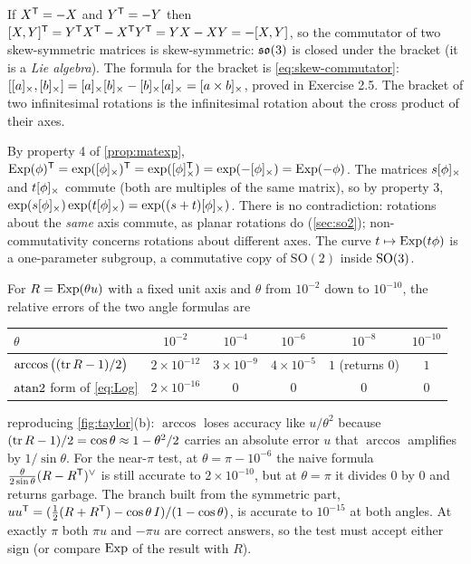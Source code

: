 \begin{solutions}
  \item If $X^{\mathsf{T}} = -X$ and $Y^{\mathsf{T}} = -Y$ then $[X, Y]^{\mathsf{T}} = Y^{\mathsf{T}} X^{\mathsf{T}} - X^{\mathsf{T}} Y^{\mathsf{T}} = YX - XY = -[X, Y]$, so the commutator of two skew-symmetric matrices is
        skew-symmetric: $\mathfrak{so}(3)$ is closed under the bracket (it is a \emph{Lie algebra}). The formula for the bracket is \eqref{eq:skew-commutator}:
        $[[a]_{\times}, [b]_{\times}] = [a]_{\times}[b]_{\times} - [b]_{\times}[a]_{\times} = [a\times b]_{\times}$, proved in Exercise 2.5. The bracket of two infinitesimal rotations is the
        infinitesimal rotation about the cross product of their axes.

  \item By property 4 of \cref{prop:matexp}, $\operatorname{Exp}(\phi)^{\mathsf{T}} = \exp([\phi]_{\times})^{\mathsf{T}} = \exp([\phi]_{\times}^{\mathsf{T}}) = \exp(-[\phi]_{\times}) = \operatorname{Exp}(-\phi)$. The matrices $s[\phi]_{\times}$
        and $t[\phi]_{\times}$ commute (both are multiples of the same matrix), so by property 3, $\exp(s[\phi]_{\times})\exp(t[\phi]_{\times}) = \exp((s + t)[\phi]_{\times})$.
        There is no contradiction: rotations about the \emph{same} axis commute, as planar rotations do (\cref{sec:so2}); non-commutativity concerns
        rotations about different axes. The curve $t \mapsto \operatorname{Exp}(t\phi)$ is a one-parameter subgroup, a commutative copy of $\mathrm{SO}(2)$ inside $\mathrm{SO}(3)$.

  \item For $R = \operatorname{Exp}(\theta u)$ with a fixed unit axis and $\theta$ from $10^{-2}$ down to $10^{-10}$, the relative errors of the two angle formulas are
        \begin{center}\small
        \begin{tabular}{@{}l c c c c c@{}}
        \toprule
        $\theta$ & $10^{-2}$ & $10^{-4}$ & $10^{-6}$ & $10^{-8}$ & $10^{-10}$ \\
        \midrule
        $\arccos\big((\operatorname{tr} R - 1)/2\big)$ & $2\times10^{-12}$ & $3\times10^{-9}$ & $4\times10^{-5}$ & $1$ (returns 0) & $1$ \\
        $\operatorname{atan2}$ form of \eqref{eq:Log} & $2\times10^{-16}$ & $0$ & $0$ & $0$ & $0$ \\
        \bottomrule
        \end{tabular}
        \end{center}
        reproducing \cref{fig:taylor}(b): $\arccos$ loses accuracy like $u/\theta^2$ because $(\operatorname{tr} R - 1)/2 = \cos\theta \approx 1 - \theta^2/2$ carries an absolute error
        $u$ that $\arccos$ amplifies by $1/\sin\theta$. For the near-$\pi$ test, at $\theta = \pi - 10^{-6}$ the naive formula
        $\frac{\theta}{2\sin\theta}(R - R^{\mathsf{T}})^{\vee}$ is still accurate to $2\times10^{-10}$, but at $\theta = \pi$ it divides $0$ by $0$ and returns garbage. The
        branch built from the symmetric part, $uu^{\mathsf{T}} = (\tfrac12(R + R^{\mathsf{T}}) - \cos\theta\,I)/(1 - \cos\theta)$, is accurate to $10^{-15}$ at both angles. At
        exactly $\pi$ both $\pi u$ and $-\pi u$ are correct answers, so the test must accept either sign (or compare $\operatorname{Exp}$ of the result with $R$).


\end{solutions}

